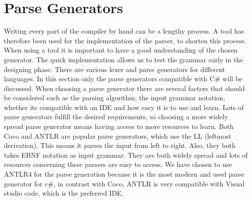 \section{Parse Generators}
Writing every part of the compiler by hand can be a lengthy process. A tool has therefore been used for the implementation of the parser, to shorten this process. When using a tool it is important to have a good understanding of the chosen generator. The quick implementation allows us to test the grammar early in the designing phase.
There are various lexer and parse generators for different languages. In this section only the parse generators compatible with C# 
will be discussed. When choosing a parse generator there are several factors that should be considered such as the parsing algorithm, the input grammar notation,
whether its compatible with an IDE and how easy it is to use and learn. Lots of parse generators fulfill the desired requirements, 
so choosing a more widely spread parse generator means having access to more resources to learn. Both Coco and ANTLR are popular parse generators, which use the LL (leftmost derivation). This means it parses the input from left to right. 
Also, they both takes EBNF notation as input grammar. They are both widely spread and lots of resources concerning these parsers are easy to access. \newline
We have chosen to use ANTLR4 for the parse generation because it is the most modern and used parse generator for c#, in contrast with Coco, ANTLR is very compatible with Visual studio code, which is the preferred IDE. 
